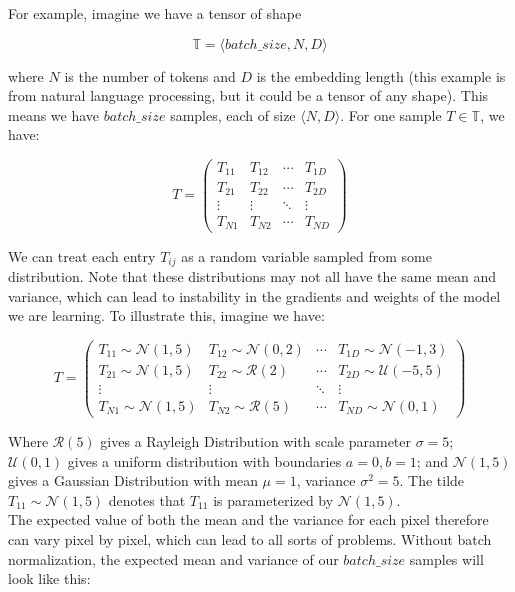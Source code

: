 \documentclass[12pt]{article}
\begin{document}
For example, imagine we have a tensor of shape 

\[\mathbb{T} = \langle batch\_size, N, D \rangle\]

where \(N\) is the number of tokens and \(D\) is the embedding length (this example is from natural language processing, but it could be a tensor of any shape). This means we have \(batch\_size\) samples, each of size \(\langle N, D \rangle\). For one sample \(T \in \mathbb{T}\), we have: 

\[ T = \begin{pmatrix}
T_{11} & T_{12} & \cdots & T_{1D} \\
T_{21} & T_{22} & \cdots & T_{2D} \\
\vdots & \vdots & \ddots & \vdots \\
T_{N1} & T_{N2} & \cdots & T_{ND}
\end{pmatrix} \]

We can treat each entry \(T_{ij}\) as a random variable sampled from some distribution. Note that these distributions may not all have the same mean and variance, which can lead to instability in the gradients and weights of the model we are learning. To illustrate this, imagine we have:

\[ T = \begin{pmatrix}
T_{11}\sim \mathcal{N}(1,5) & T_{12}\sim \mathcal{N}(0,2)  & \cdots & T_{1D}\sim \mathcal{N}(-1,3)  \\
T_{21}\sim \mathcal{N}(1,5)  & T_{22}\sim \mathcal{R}(2)  & \cdots & T_{2D}\sim \mathcal{U}(-5,5)  \\
\vdots & \vdots & \ddots & \vdots \\
T_{N1}\sim \mathcal{N}(1,5)  & T_{N2}\sim \mathcal{R}(5)  & \cdots & T_{ND}\sim \mathcal{N}(0,1) 
\end{pmatrix} \]

Where \(\mathcal{R}(5)\) gives a Rayleigh Distribution with scale parameter \(\sigma=5\); \(\mathcal{U}(0,1)\) gives a uniform distribution with boundaries \(a=0, b=1\); and \(\mathcal{N}(1,5)\) gives a Gaussian Distribution with mean \(\mu=1\), variance \(\sigma^2=5\). The tilde \(T_{11}\sim \mathcal{N}(1,5)\) denotes that \(T_{11}\) is parameterized by \(\mathcal{N}(1,5)\). \\

The expected value of both the mean and the variance for each pixel therefore can vary pixel by pixel, which can lead to all sorts of problems. Without batch normalization, the expected mean and variance of our \(batch\_size\) samples will look like this: 
\end{document}
